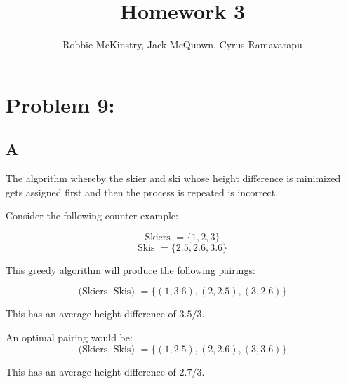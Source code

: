 \documentclass[12pt]{article}
\begin{document}
\title{Homework 3}
\author{Robbie McKinstry, Jack McQuown, Cyrus Ramavarapu}
\renewcommand{\today}{7 September 2016}
\renewcommand{\baselinestretch}{1.5}

\maketitle

\section*{Problem 9:}
\subsection*{A}

The algorithm whereby the skier and ski whose height difference
is minimized gets assigned first and then the process is repeated
is incorrect.


Consider the following counter example:

\[
\text{Skiers } = \{1,2,3\}
\]
\[
\text{Skis } = \{2.5, 2.6, 3.6\}
\]

This greedy algorithm will produce the following pairings:

\[
\text{(Skiers, Skis) } = \{(1,3.6),(2,2.5),(3,2.6)\}
\]

This has an average height difference of $3.5/3$.

An optimal pairing would be:
\[
\text{(Skiers, Skis) } = \{(1,2.5),(2,2.6),(3,3.6)\}
\]

This has an average height difference of $2.7/3$.
\end{document}
